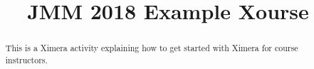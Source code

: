 \documentclass{xourse}
\title{JMM 2018 Example Xourse}
\begin{document}
  
\begin{abstract} %
  This is a Ximera activity explaining how to get started with Ximera
  for course instructors.
\end{abstract}  
\maketitle  
 
 
\end{document}
